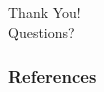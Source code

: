 \documentclass[10pt]{beamer}
\begin{document}

\section*{} %

\begin{frame}{}
  \begin{center}
\Large    
Thank You!\\

\vspace{0.3cm}
\large
Questions?
  \end{center}
\end{frame}










\begin{frame}[allowframebreaks]
        \frametitle{References}
        \nocite{*}
        
        
\end{frame}
\end{document}

